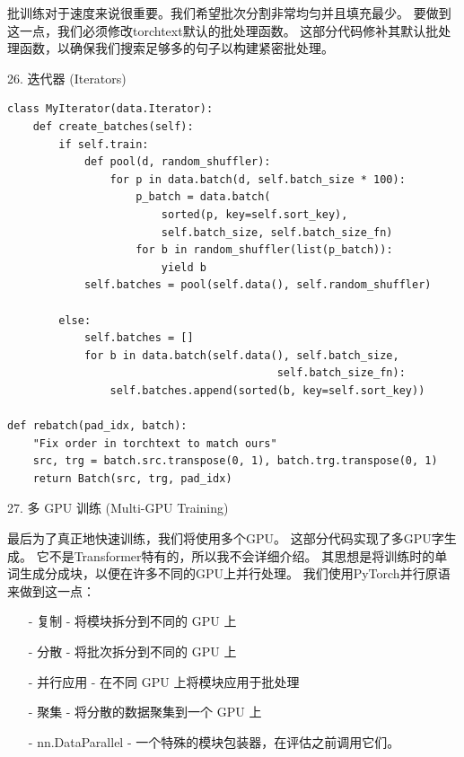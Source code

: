 批训练对于速度来说很重要。我们希望批次分割非常均匀并且填充最少。 要做到这一点，我们必须修改torchtext默认的批处理函数。 这部分代码修补其默认批处理函数，以确保我们搜索足够多的句子以构建紧密批处理。

26. 迭代器 (Iterators)

\begin{Verbatim}
class MyIterator(data.Iterator):
    def create_batches(self):
        if self.train:
            def pool(d, random_shuffler):
                for p in data.batch(d, self.batch_size * 100):
                    p_batch = data.batch(
                        sorted(p, key=self.sort_key),
                        self.batch_size, self.batch_size_fn)
                    for b in random_shuffler(list(p_batch)):
                        yield b
            self.batches = pool(self.data(), self.random_shuffler)
            
        else:
            self.batches = []
            for b in data.batch(self.data(), self.batch_size,
                                          self.batch_size_fn):
                self.batches.append(sorted(b, key=self.sort_key))

def rebatch(pad_idx, batch):
    "Fix order in torchtext to match ours"
    src, trg = batch.src.transpose(0, 1), batch.trg.transpose(0, 1)
    return Batch(src, trg, pad_idx)
\end{Verbatim}

27. 多 GPU 训练 (Multi-GPU Training)

最后为了真正地快速训练，我们将使用多个GPU。 这部分代码实现了多GPU字生成。 它不是Transformer特有的，所以我不会详细介绍。 其思想是将训练时的单词生成分成块，以便在许多不同的GPU上并行处理。 我们使用PyTorch并行原语来做到这一点：

\begin{itemize}
\item [-] 复制 - 将模块拆分到不同的 GPU 上
\item [-] 分散 - 将批次拆分到不同的 GPU 上
\item [-] 并行应用 - 在不同 GPU 上将模块应用于批处理
\item [-] 聚集 - 将分散的数据聚集到一个 GPU 上
\item [-] nn.DataParallel - 一个特殊的模块包装器，在评估之前调用它们。
\end{itemize}

